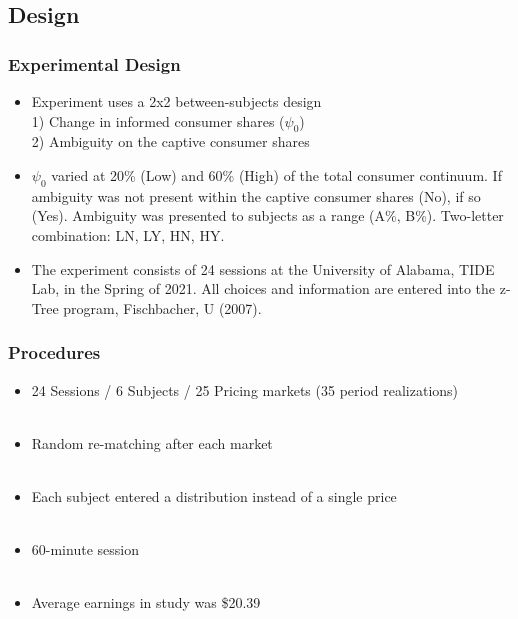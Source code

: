 \documentclass[red]{beamer}
\begin{document}
\begin{frame} [t]
\section{Design}
\frametitle{Experimental Design}
\begin{itemize}
\setlength{\itemsep}{20pt}
    \item Experiment uses a 2x2 between-subjects design \\
    \hspace*{30pt} 1) Change in informed consumer shares ($\psi_0$) \\
    \hspace*{30pt} 2) Ambiguity on the captive consumer shares\\
    \item $\psi_0$ varied at 20\% (Low) and 60\% (High) of the total consumer continuum. If ambiguity was not present within the captive consumer shares (No), if so (Yes). Ambiguity was presented to subjects as a range (A\%, B\%). Two-letter combination: LN, LY, HN, HY. \\
    
    \item The experiment consists of 24 sessions at the University of Alabama, TIDE Lab, in the Spring of 2021. All choices and information are entered into the z-Tree program, Fischbacher, U (2007).
\end{itemize}
\end{frame}





\begin{frame} [t]
\frametitle{Procedures}
\begin{itemize}
    \item 24 Sessions / 6 Subjects / 25 Pricing markets (35 period realizations) 
    \\~\\
    \item Random re-matching after each market
    \\~\\
    \item Each subject entered a distribution instead of a single price
    \\~\\
    \item 60-minute session
    \\~\\
    \item Average earnings in study was \$20.39
\end{itemize}
\end{frame}
\end{document}
